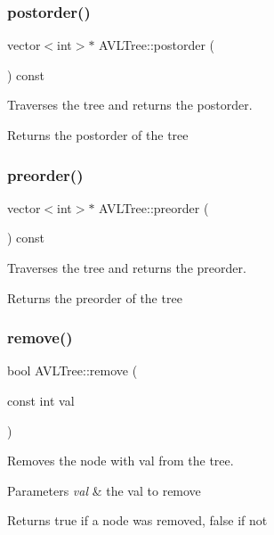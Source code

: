 \subsubsection{\texorpdfstring{postorder()}{postorder()}}
{\footnotesize\ttfamily vector$<$int$>$$\ast$ A\+V\+L\+Tree\+::postorder (\begin{DoxyParamCaption}{ }\end{DoxyParamCaption}) const}

Traverses the tree and returns the postorder.

\begin{DoxyReturn}{Returns}
the postorder of the tree 
\end{DoxyReturn}
\mbox{\label{classAVLTree_a722bc2e2f36161ab95f477c4241034f9}} 
\subsubsection{\texorpdfstring{preorder()}{preorder()}}
{\footnotesize\ttfamily vector$<$int$>$$\ast$ A\+V\+L\+Tree\+::preorder (\begin{DoxyParamCaption}{ }\end{DoxyParamCaption}) const}

Traverses the tree and returns the preorder.

\begin{DoxyReturn}{Returns}
the preorder of the tree 
\end{DoxyReturn}
\mbox{\label{classAVLTree_ae128228ecf5727ca598c884c20db0ddc}} 
\subsubsection{\texorpdfstring{remove()}{remove()}}
{\footnotesize\ttfamily bool A\+V\+L\+Tree\+::remove (\begin{DoxyParamCaption}\item[{const int}]{val }\end{DoxyParamCaption})}

Removes the node with val from the tree.


\begin{DoxyParams}{Parameters}
{\em val} & the val to remove \\
\hline
\end{DoxyParams}
\begin{DoxyReturn}{Returns}
true if a node was removed, false if not 
\end{DoxyReturn}
\mbox{\label{classAVLTree_af39c6e1bedbb1a685342d45c5e7b2263}} 
